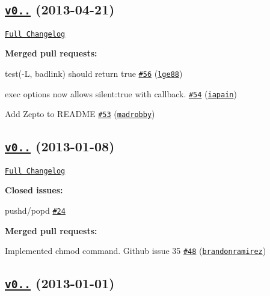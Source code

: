 \subsection*{\href{https://github.com/shelljs/shelljs/tree/v0.1.3}{\tt v0..} (2013-\/04-\/21)}

\href{https://github.com/shelljs/shelljs/compare/v0.1.2...v0.1.3}{\tt Full Changelog}

{\bfseries Merged pull requests\+:}


\begin{DoxyItemize}
\item test(\textquotesingle{}-\/L\textquotesingle{}, badlink) should return true \href{https://github.com/shelljs/shelljs/pull/56}{\tt \#56} (\href{https://github.com/lge88}{\tt lge88})
\item exec options now allows {\ttfamily silent\+:true} with callback. \href{https://github.com/shelljs/shelljs/pull/54}{\tt \#54} (\href{https://github.com/iapain}{\tt iapain})
\item Add Zepto to R\+E\+A\+D\+ME \href{https://github.com/shelljs/shelljs/pull/53}{\tt \#53} (\href{https://github.com/madrobby}{\tt madrobby})
\end{DoxyItemize}

\subsection*{\href{https://github.com/shelljs/shelljs/tree/v0.1.2}{\tt v0..} (2013-\/01-\/08)}

\href{https://github.com/shelljs/shelljs/compare/v0.1.1...v0.1.2}{\tt Full Changelog}

{\bfseries Closed issues\+:}


\begin{DoxyItemize}
\item pushd/popd \href{https://github.com/shelljs/shelljs/issues/24}{\tt \#24}
\end{DoxyItemize}

{\bfseries Merged pull requests\+:}


\begin{DoxyItemize}
\item Implemented chmod command. Github issue 35 \href{https://github.com/shelljs/shelljs/pull/48}{\tt \#48} (\href{https://github.com/brandonramirez}{\tt brandonramirez})
\end{DoxyItemize}

\subsection*{\href{https://github.com/shelljs/shelljs/tree/v0.1.1}{\tt v0..} (2013-\/01-\/01)}

